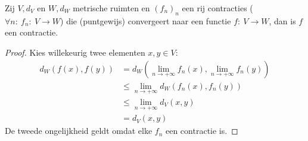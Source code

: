 \documentclass[main.tex]{subfiles}
\begin{document}
\begin{st}
  \label{st:limiet-van-rij-contracties-is-contractie}
  Zij $V,d_{V}$ en $W,d_{W}$ metrische ruimten en $(f_{n})_{n}$ een rij contracties ($\forall n:\ f_{n}:\ V \rightarrow W$) die (puntgewijs) convergeert naar een functie $f:\ V \rightarrow W$, dan is $f$ een contractie.
  
  \begin{proof}
    Kies willekeurig twee elementen $x,y\in V$:
    \begin{align*}
      d_{W}(f(x),f(y))
      &= d_{W}(\lim_{n\rightarrow +\infty}f_{n}(x),\lim_{n\rightarrow +\infty}f_{n}(y))\\
      &\le \lim_{n\rightarrow +\infty}d_{W}(f_{n}(x),f_{n}(y))\\
      &\le \lim_{n\rightarrow +\infty}d_{V}(x,y)\\
      &= d_{V}(x,y)
    \end{align*}
    De tweede ongelijkheid geldt omdat elke $f_{n}$ een contractie is.
  \end{proof}
\end{st}
\end{document}
